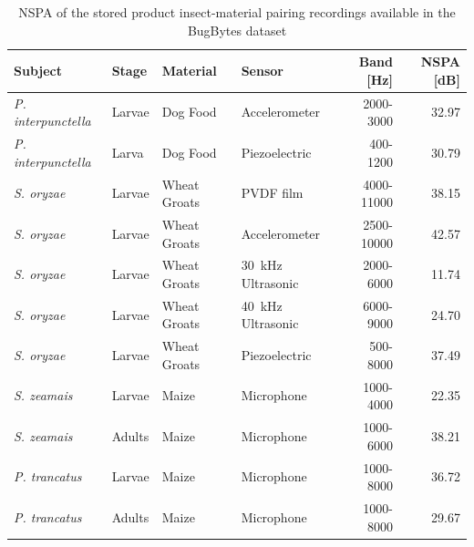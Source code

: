 \begin{table}[!htbp]
	\caption{NSPA of the stored product insect-material pairing recordings available in the BugBytes dataset \label{tab:bugbytes}}
	\centering
    \small
	\begin{tabular}{llllrr}
		\toprule
		\textbf{Subject}           & \textbf{Stage} & \textbf{Material} & \textbf{Sensor}                 & \textbf{Band} [\si{\hertz}] & \textbf{NSPA} [\si{\deci\bel}] \\ \midrule
		\textit{P. interpunctella} & Larvae         & Dog Food          & Accelerometer                   & 2000-3000                   & 32.97                          \\
		\textit{P. interpunctella} & Larva          & Dog Food          & Piezoelectric                   & 400-1200                    & 30.79                          \\
		\textit{S. oryzae}         & Larvae         & Wheat Groats      & PVDF film                       & 4000-11000                  & 38.15                          \\
		\textit{S. oryzae}         & Larvae         & Wheat Groats      & Accelerometer                   & 2500-10000                  & 42.57                          \\
		\textit{S. oryzae}         & Larvae         & Wheat Groats      & \SI{30}{\kilo\hertz} Ultrasonic & 2000-6000                   & 11.74                          \\
		\textit{S. oryzae}         & Larvae         & Wheat Groats      & \SI{40}{\kilo\hertz} Ultrasonic & 6000-9000                   & 24.70                          \\
		\textit{S. oryzae}         & Larvae         & Wheat Groats      & Piezoelectric                   & 500-8000                    & 37.49                          \\
		\textit{S. zeamais}        & Larvae         & Maize             & Microphone                      & 1000-4000                   & 22.35                          \\
		\textit{S. zeamais}        & Adults         & Maize             & Microphone                      & 1000-6000                   & 38.21                          \\
		\textit{P. trancatus}      & Larvae         & Maize             & Microphone                      & 1000-8000                   & 36.72                          \\
		\textit{P. trancatus}      & Adults         & Maize             & Microphone                      & 1000-8000                   & 29.67                          \\ \bottomrule
	\end{tabular}
\end{table}

